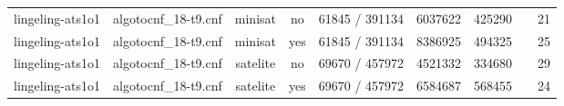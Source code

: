 \begin{appendices}
\begin{table}[p]
\begin{center}
\begin{tabular}{l|cccccccc}
  lingeling-ats1o1               & algotocnf\_18-t9.cnf           & minisat    & no    & 61845 / 391134 & 6037622   & 425290    &            & 21 \\ %
  lingeling-ats1o1               & algotocnf\_18-t9.cnf           & minisat    & yes   & 61845 / 391134 & 8386925   & 494325    &            & 25 \\ %
  lingeling-ats1o1               & algotocnf\_18-t9.cnf           & satelite   & no    & 69670 / 457972 & 4521332   & 334680    &            & 29 \\ %
  lingeling-ats1o1               & algotocnf\_18-t9.cnf           & satelite   & yes   & 69670 / 457972 & 6584687   & 568455    &            & 24 \\ %
    \end{tabular}
  \end{center}
\end{table}

\newpage


\end{appendices}
